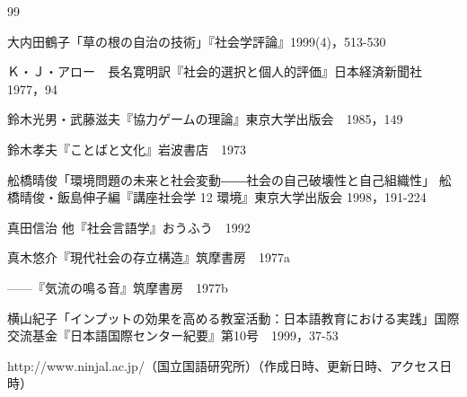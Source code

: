 \documentclass[type=master,lang=ja]{sjtuthesis}
\begin{document}
\maketitle

\copyrightpage

\frontmatter

\begin{abstract}[lang=zh]
  
\end{abstract}

\begin{abstract}[lang=en]
  
\end{abstract}

\begin{abstract}[lang=ja]
  
\end{abstract}

\tableofcontents
\listoffigures
\listoftables

\mainmatter



\begin{thebibliography}{99}
  \item 大内田鶴子「草の根の自治の技術」『社会学評論』1999(4)，513-530
  \item Ｋ・Ｊ・アロー　長名寛明訳『社会的選択と個人的評価』日本経済新聞社　1977，94
  \item 鈴木光男・武藤滋夫『協力ゲームの理論』東京大学出版会　1985，149
  \item 鈴木孝夫『ことばと文化』岩波書店　1973
  \item 舩橋晴俊「環境問題の未来と社会変動――社会の自己破壊性と自己組織性」
        舩橋晴俊・飯島伸子編『講座社会学 12 環境』東京大学出版会 1998，191-224
  \item 真田信治 他『社会言語学』おうふう　1992
  \item 真木悠介『現代社会の存立構造』筑摩書房　1977a
  \item ------『気流の鳴る音』筑摩書房　1977b
  \item 横山紀子「インプットの効果を高める教室活動：日本語教育における実践」国際交流基金『日本語国際センター紀要』第10号　1999，37-53
  \item http://www.ninjal.ac.jp/（国立国語研究所）（作成日時、更新日時、アクセス日時）
\end{thebibliography}

\appendix

\captionsetup{list=no}



\backmatter







\end{document}
